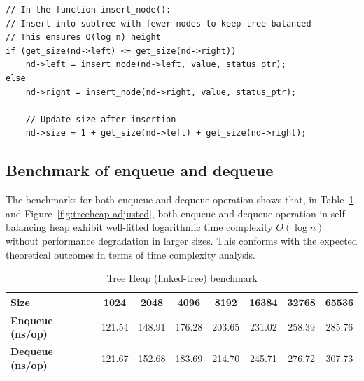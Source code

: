 \documentclass[a4paper,11pt]{article}
\begin{document}
\begin{verbatim}
// In the function insert_node():
// Insert into subtree with fewer nodes to keep tree balanced
// This ensures O(log n) height
if (get_size(nd->left) <= get_size(nd->right))
    nd->left = insert_node(nd->left, value, status_ptr);
else
    nd->right = insert_node(nd->right, value, status_ptr);

    // Update size after insertion
    nd->size = 1 + get_size(nd->left) + get_size(nd->right);
\end{verbatim}

\subsection*{Benchmark of enqueue and dequeue}

The benchmarks for both enqueue and dequeue operation shows that, in Table~\ref{tab:treeheap-transposed-adjusted} and Figure~\ref{fig:treeheap-adjusted}, both enqueue and dequeue operation in self-balancing heap exhibit well-fitted logarithmic time complexity $O(\log n)$ without performance degradation in larger sizes. This conforms with the expected theoretical outcomes in terms of time complexity analysis.

\begin{table}[h]
\centering
\begin{tabular}{l|ccccccc}
\textbf{Size}
    & 1024 & 2048 & 4096 & 8192 & 16384 & 32768 & 65536 \\
\hline
\textbf{Enqueue (ns/op)}
    & 121.54 & 148.91 & 176.28 & 203.65 & 231.02 & 258.39 & 285.76 \\
\textbf{Dequeue (ns/op)}
    & 121.67 & 152.68 & 183.69 & 214.70 & 245.71 & 276.72 & 307.73 \\
\end{tabular}
\caption{Tree Heap (linked-tree) benchmark}
\label{tab:treeheap-transposed-adjusted}
\end{table}
\end{document}
